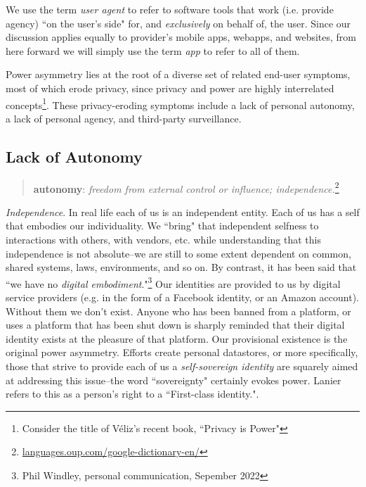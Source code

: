 \documentclass[11pt, oneside]{article}   	%
\newcommand{\hyperfootnote}[1][]{\def\ArgI{{#1}}\hyperfootnoteRelay}
\newcommand\hyperfootnoteRelay[2][]{\href{#1#2}{\ArgI}\footnote{\href{#1#2}{#2}}}
\begin{document}
We use the term \emph{user agent} to refer to software tools that work (i.e. provide agency) ``on the user's side" for, and \emph{exclusively} on behalf of, the user. Since our discussion applies equally to provider's mobile apps, webapps, and websites, from here forward we will simply use the term \emph{app} to refer to all of them.

Power asymmetry lies at the root of a diverse set of related end-user symptoms, most of which erode privacy, since privacy and power are highly interrelated concepts\footnote{Consider the title of V\'eliz's recent book, ``Privacy is Power"\cite{veliz2020}}. 
These privacy-eroding symptoms include a lack of personal autonomy, a lack of personal agency, and third-party surveillance. 

\subsection{Lack of Autonomy}

\begin{quote}
\textbf{au\hspace{0.5mm}\tiny {}\normalsize \hspace{0.5mm}ton\hspace{0.5mm}\tiny {}\normalsize \hspace{0.5mm}o\hspace{0.5mm}\tiny {}\normalsize \hspace{0.5mm}my}: \emph{freedom from external control or influence; independence.}\hyperfootnote[][https://]{languages.oup.com/google-dictionary-en/}
\end{quote}

\emph{Independence}. In real life each of us is an independent entity. Each of us has a self that embodies our individuality. We ``bring" that independent selfness to interactions with others, with vendors, etc. while understanding that this independence is not absolute--we are still to some extent dependent on common, shared systems, laws, environments, and so on. By contrast, it has been said that ``we have no \emph{digital embodiment}."\footnote{Phil Windley, personal communication, Sepember 2022}  Our identities are provided to us by digital service providers (e.g. in the form of a Facebook identity, or an Amazon account). Without them we don't exist. Anyone who has been banned from a platform, or uses a platform that has been shut down is sharply reminded that their digital identity exists at the pleasure of that platform. Our provisional existence is the original power asymmetry. Efforts create personal datastores, or more specifically, those that strive to provide each of us a \emph{self-sovereign identity}\cite{Preukschat2021} are squarely aimed at addressing this issue--the word ``sovereignty" certainly evokes power. Lanier refers to this as a person's right to a ``First-class identity."\cite[p251]{Lanier2014}.
\end{document}
